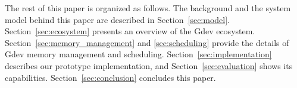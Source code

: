 The rest of this paper is organized as follows.
The background and the system model behind this paper are described in
Section~\ref{sec:model}.
Section~\ref{sec:ecosystem} presents an overview of the Gdev ecosystem.
Section~\ref{sec:memory_management} and \ref{sec:scheduling} provide the
details of Gdev memory management and scheduling.
Section~\ref{sec:implementation} describes our prototype implementation,
and Section~\ref{sec:evaluation} shows its capabilities.
Section~\ref{sec:conclusion} concludes this paper.
